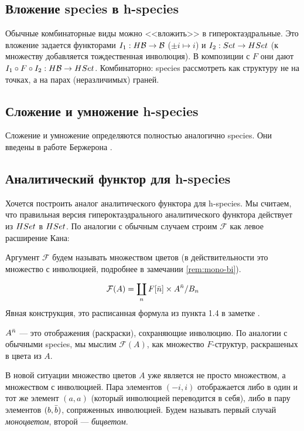 \subsection{Вложение species в h-species}
Обычные комбинаторные виды можно <<вложить>> в гипероктаэдральные. Это вложение
задается функторами $I_1:H\mathcal B \rightarrow \mathcal B$ ($\pm i \mapsto i$) и $I_2:Set
\rightarrow HSet$ (к множеству добавляется тождественная инволюция).
В композиции с $F$ они дают $I_1 \circ F \circ I_2 : H\mathcal B \rightarrow HSet$.
Комбинаторно: species рассмотреть как структуру не на точках, а на
парах (неразличимых) граней.

\subsection{Сложение и умножение h-species}
Сложение и умножение определяются полностью аналогично species. Они введены в
работе Бержерона \cite{BergH}.

\subsection{Аналитический функтор для h-species}
Хочется построить аналог аналитического функтора для h-species. Мы считаем, что
правильная версия гипероктаэдрального аналитического функтора действует из
$HSet$ в $HSet$. По аналогии с обычным случаем строим $\mathcal F$ как левое
расширение Кана:


Аргумент $\mathcal F$ будем называть множеством цветов (в действительности это
множество с инволюцией, подробнее в замечании \ref{rem:mono-bi}).

\begin{equation}
\label{eq:h-an}
	\mathcal F(A) = \coprod\limits_n F[\Bar n] \times A^{\Bar n} / B_n
\end{equation}
Явная конструкция, это расписанная формула из пункта 1.4 в заметке
\cite{doldkan}.

$A^{\Bar n}$ --- это отображения (раскраски), сохраняющие инволюцию. По
аналогии с обычными species, мы мыслим $\mathcal F(A)$, как множество
$F$-структур, раскрашеных в цвета из $A$.
\begin{remark}
\label{rem:mono-bi}
В новой ситуации множество цветов $A$ уже является не просто множеством, а
множеством с инволюцией. Пара элементов $(-i, i)$ отображается либо
в один и тот же элемент $(a, a)$ (который инволюцией переводится в себя), либо
в пару элементов $(b, \Bar b)$, сопряженных инволюцией. Будем называть первый
случай \emph{моноцветом}, второй --- \emph{бицветом}.
\end{remark}


